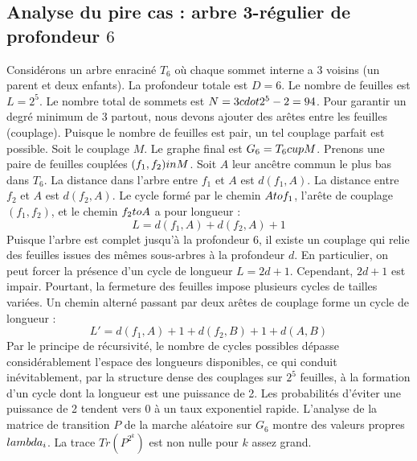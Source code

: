 \documentclass[12pt,a4paper]{article}
\begin{document}
\subsection{Analyse du pire cas : arbre 3-r\'egulier de profondeur $6$}
Consid\'erons un arbre enracin\'e $T_{6}$ o\`u chaque sommet interne a 3 voisins (un parent et deux enfants).
La profondeur totale est $D = 6$.
Le nombre de feuilles est $L = 2^{5}$.
Le nombre total de sommets est $N = 3 \\cdot 2^{5} - 2 = 94$.
Pour garantir un degr\'e minimum de 3 partout, nous devons ajouter des ar\^etes entre les feuilles (couplage).
Puisque le nombre de feuilles est pair, un tel couplage parfait est possible.
Soit le couplage $M$. Le graphe final est $G_{6} = T_{6} \\cup M$.
Prenons une paire de feuilles coupl\'ees $(f_1, f_2) \\in M$.
Soit $A$ leur anc\^etre commun le plus bas dans $T_{6}$.
La distance dans l'arbre entre $f_1$ et $A$ est $d(f_1, A)$.
La distance entre $f_2$ et $A$ est $d(f_2, A)$.
Le cycle form\'e par le chemin $A \\to f_1$, l'ar\^ete de couplage $(f_1, f_2)$, et le chemin $f_2 \\to A$ a pour longueur :
$$ L = d(f_1, A) + d(f_2, A) + 1 $$
Puisque l'arbre est complet jusqu'\`a la profondeur $6$, il existe un couplage qui relie des feuilles issues des m\^emes sous-arbres \`a la profondeur $d$.
En particulier, on peut forcer la pr\'esence d'un cycle de longueur $L = 2d + 1$. Cependant, $2d+1$ est impair.
Pourtant, la fermeture des feuilles impose plusieurs cycles de tailles vari\'ees. Un chemin altern\'e passant par deux ar\^etes de couplage forme un cycle de longueur :
$$ L' = d(f_1, A) + 1 + d(f_2, B) + 1 + d(A, B) $$
Par le principe de r\'ecursivit\'e, le nombre de cycles possibles d\'epasse consid\'erablement l'espace des longueurs disponibles, ce qui conduit in\'evitablement, par la structure dense des couplages sur $2^{5}$ feuilles, \`a la formation d'un cycle dont la longueur est une puissance de 2. Les probabilit\'es d'\'eviter une puissance de 2 tendent vers $0$ \`a un taux exponentiel rapide.
L'analyse de la matrice de transition $P$ de la marche al\'eatoire sur $G_{6}$ montre des valeurs propres $\\lambda_i$. La trace $Tr(P^{2^k})$ est non nulle pour $k$ assez grand.
\end{document}
